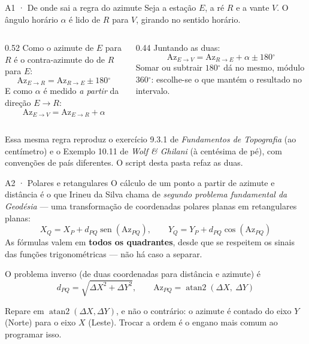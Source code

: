 \documentclass[aspectratio=169,11pt]{beamer}
\begin{document}
\begin{frame}{A1 · De onde sai a regra do azimute}
  \small
  Seja a estação $E$, a ré $R$ e a vante $V$. O ângulo horário $\alpha$ é lido de $R$ para
  $V$, girando no sentido horário.
  \medskip
  \begin{columns}[T]
    \begin{column}{0.52\textwidth}
      Como o azimute de $E$ para $R$ é o contra-azimute do de $R$ para $E$:
      \[ \text{Az}_{E \to R} = \text{Az}_{R \to E} \pm 180\ensuremath{^\circ} \]
      E como $\alpha$ é medido \emph{a partir} da direção $E \to R$:
      \[ \text{Az}_{E \to V} = \text{Az}_{E \to R} + \alpha \]
    \end{column}
    \begin{column}{0.44\textwidth}
      Juntando as duas:
      \[ \boxed{\;\text{Az}_{E \to V} = \text{Az}_{R \to E} + \alpha \pm 180\ensuremath{^\circ}\;} \]
      \medskip
      Somar ou subtrair $180\ensuremath{^\circ}$ dá no mesmo, módulo $360\ensuremath{^\circ}$:
      escolhe-se o que mantém o resultado no intervalo.
    \end{column}
  \end{columns}
  \medskip
  \begin{ideia}[title={Conferência}]
    Essa mesma regra reproduz o exercício 9.3.1 de \emph{Fundamentos de Topografia} (ao
    centímetro) e o Exemplo 10.11 de \emph{Wolf \& Ghilani} (à centésima de pé), com
    convenções de país diferentes. O script desta pasta refaz as duas.
  \end{ideia}
\end{frame}

\begin{frame}{A2 · Polares e retangulares}
  \small
  O cálculo de um ponto a partir de azimute e distância é o que Irineu da Silva chama de
  \emph{segundo problema fundamental da Geodésia} --- uma transformação de coordenadas
  polares planas em retangulares planas:
  \[ X_Q = X_P + d_{PQ}\operatorname{sen}(\text{Az}_{PQ}), \qquad
     Y_Q = Y_P + d_{PQ}\cos(\text{Az}_{PQ}) \]
  As fórmulas valem em \textbf{todos os quadrantes}, desde que se respeitem os sinais das
  funções trigonométricas --- não há caso a separar.
  \medskip

  O problema inverso (de duas coordenadas para distância e azimute) é
  \[ d_{PQ} = \sqrt{\Delta X^2 + \Delta Y^2}, \qquad
     \text{Az}_{PQ} = \operatorname{atan2}(\Delta X,\ \Delta Y) \]
  \begin{cuidado}[title={A ordem dos argumentos}]
    Repare em $\operatorname{atan2}(\Delta X, \Delta Y)$, e não o contrário: o azimute é
    contado do eixo $Y$ (Norte) para o eixo $X$ (Leste). Trocar a ordem é o engano mais
    comum ao programar isso.
  \end{cuidado}
\end{frame}
\end{document}
